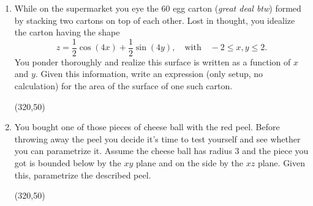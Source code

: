 \documentclass[12pt]{exam}
\newcommand{\word}[1]{\quad\text{#1}\quad} %
\begin{document}
\begin{enumerate} 

\item While on the supermarket you eye the 60 egg carton (\textit{great deal btw}) formed by stacking two cartons on top of each other. Lost in thought, you idealize the carton having the shape
$$ z=\frac12\cos(4x)+\frac12\sin(4y),\word{with} -2\leq x,y\leq 2.$$
You ponder thoroughly and realize this surface is written as a function of $x$ and $y$. Given this information, write an expression (only setup, no calculation) for the area of the surface of one such carton. 
\vfill
\begin{flushleft}
\end{flushleft}
\begin{flushright}
\framebox(320,50){}
\end{flushright}

\item You bought one of those pieces of cheese ball with the red peel. Before throwing away the peel you decide it's time to test yourself and see whether you can parametrize it. Assume the cheese ball has radius $3$ and the piece you got is bounded below by the $xy$ plane and on the side by the $xz$ plane. Given this, parametrize the described peel.
\vfill
\begin{flushleft}
\end{flushleft}
\begin{flushright}
\framebox(320,50){}
\end{flushright}


\end{enumerate}
\end{document}

